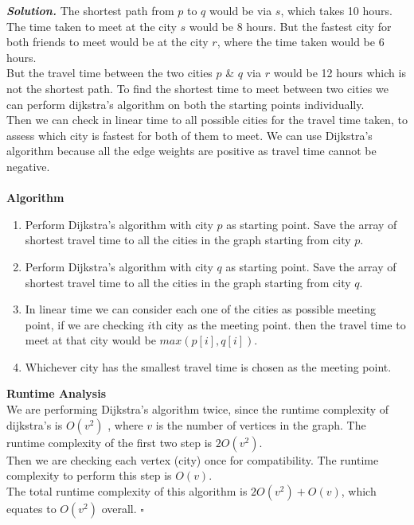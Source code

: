 \documentclass[12pt]{article}
\newenvironment{solution}[1][\it{Solution}]{\textbf{#1. } }{$\square$}
\begin{document}
\begin{solution}
\indent The shortest path from $p$ to $q$ would be via $s$, which takes 10 hours. The time taken to meet at the city $s$ would be 8 hours. But the fastest city for both friends to meet would be at the city $r$, where the time taken would be 6 hours. 
\\ \indent But the travel time between the two cities $p$ \& $q$ via $r$ would be 12 hours which is not the shortest path.   To find the shortest time to meet between two cities we can perform dijkstra's algorithm on both the starting points individually.  
\\ \indent Then we can check in linear time to all possible cities for the travel time taken, to assess which city is fastest for both of them to meet. We can use Dijkstra's algorithm because all the edge weights are positive as travel time cannot be negative. \\
\\ \textbf{Algorithm}
\begin{enumerate}
    \item Perform Dijkstra's algorithm with city $p$ as starting point. Save the array of shortest travel time to all the cities in the graph starting from city $p$. 
    \item Perform Dijkstra's algorithm with city $q$ as starting point. Save the array of shortest travel time to all the cities in the graph starting from city $q$. 
    \item In linear time we can consider each one of the cities as possible meeting point, if we are checking  $i$th city as the meeting point. then the travel time to meet at that city would be $max(p[i],q[i])$. 
    \item Whichever city has the smallest travel time is chosen as the meeting point.
\end{enumerate}
\textbf{Runtime Analysis}\\
\indent We are performing Dijkstra's algorithm twice, since the runtime complexity of dijkstra's is $O(v^2)$ , where $v$ is the number of vertices in the graph. The runtime complexity of the first two step is $2O(v^2)$. 
\\ \indent Then we are checking each vertex (city) once for compatibility. The runtime complexity to perform this step is $O(v)$. 
\ \\\indent The total runtime complexity of this algorithm is $2O(v^2)+O(v)$, which equates to $O(v^2)$ overall. 
\end{solution} 

\hrulefill %
\end{document}
